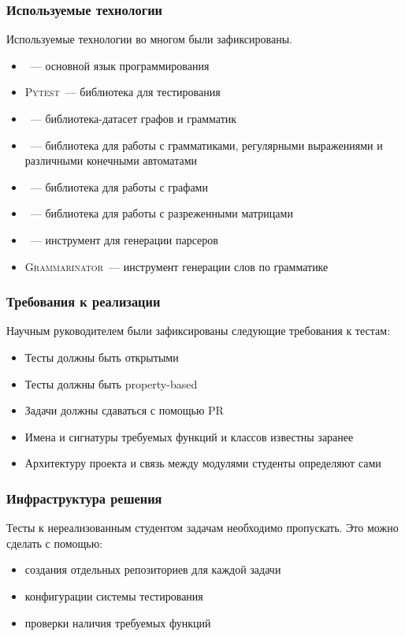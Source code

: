 \documentclass[aspectratio=169]{beamer}
\begin{document}
\begin{frame}
	\frametitle{Используемые технологии}

	Используемые технологии во многом были зафиксированы.
	\begin{itemize}
		\item \python{}~--- основной язык программирования
		\item \textsc{Pytest}~--- библиотека для тестирования
		\item \cfpqdata{}~--- библиотека-датасет графов и грамматик
		\item \pyformlang{}~--- библиотека для работы с грамматиками, регулярными выражениями и различными конечными автоматами
		\item \networkx{}~--- библиотека для работы с графами
		\item \scipy{}~--- библиотека для работы с разреженными матрицами
		\item \antlr{}~--- инструмент для генерации парсеров
		\item \textsc{Grammarinator}~--- инструмент генерации слов по грамматике \antlr{}
	\end{itemize}

\end{frame}

\begin{frame}
	\frametitle{Требования к реализации}

	Научным руководителем были зафиксированы следующие требования к тестам:
	\begin{itemize}
		\item Тесты должны быть открытыми
		\item Тесты должны быть property-based
		\item Задачи должны сдаваться с помощью PR
		\item Имена и сигнатуры требуемых функций и классов известны заранее
		\item Архитектуру проекта и связь между модулями студенты определяют сами
	\end{itemize}

\end{frame}

\begin{frame}
	\frametitle{Инфраструктура решения}

	Тесты к нереализованным студентом задачам необходимо пропускать.
	Это можно сделать с помощью:
	\begin{itemize}
		\item создания отдельных репозиториев для каждой задачи
		\item конфигурации системы тестирования
		\item проверки наличия требуемых функций
	\end{itemize}

\end{frame}
\end{document}
